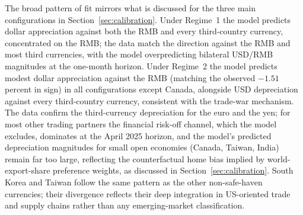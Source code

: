 \documentclass[11pt]{article}
\theoremstyle{plain}
\theoremstyle{remark}
\numberwithin{lemma}{section}
\numberwithin{proposition}{section}
\numberwithin{corollary}{section}
\newcommand{\rev}[1]{{\color{RevBlue}#1}}
\begin{document}
\begin{appendix}
\rev{The broad pattern of fit mirrors what is discussed for the three main configurations in Section~\ref{sec:calibration}. Under Regime~1 the model predicts dollar appreciation against both the RMB and every third-country currency, concentrated on the RMB; the data match the direction against the RMB and most third currencies, with the model overpredicting bilateral USD/RMB magnitudes at the one-month horizon. Under Regime~2 the model predicts modest dollar appreciation against the RMB (matching the observed $-1.51$ percent in sign) in all configurations except Canada, alongside USD depreciation against every third-country currency, consistent with the trade-war mechanism. The data confirm the third-currency depreciation for the euro and the yen; for most other trading partners the financial risk-off channel, which the model excludes, dominates at the April 2025 horizon, and the model's predicted depreciation magnitudes for small open economies (Canada, Taiwan, India) remain far too large, reflecting the counterfactual home bias implied by world-export-share preference weights, as discussed in Section~\ref{sec:calibration}. South Korea and Taiwan follow the same pattern as the other non-safe-haven currencies; their divergence reflects their deep integration in US-oriented trade and supply chains rather than any emerging-market classification.}


\end{appendix}
\end{document}
